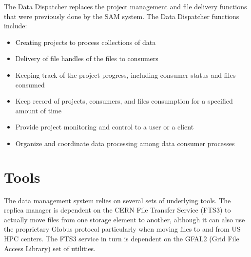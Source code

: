 \documentclass[../main-v1.tex]{subfiles}
\begin{document}
The Data Dispatcher replaces the project management and file delivery functions that were previously done by the SAM system.  The Data Dispatcher functions include:
\begin{itemize}
    \item Creating projects to process collections of data
    
    \item Delivery of file handles of the files to consumers
    
    \item Keeping track of the project progress, including consumer status and files consumed
    
    \item Keep record of projects, consumers, and files consumption for a specified amount of time
    
    \item Provide project monitoring and control to a user or a client
    
    \item Organize and coordinate data processing among data consumer processes

\end{itemize}



\section{Tools}

The data management system relies on several sets of underlying tools.  The  replica manager is dependent on the CERN File Transfer Service (FTS3) \cite{Kiryanov:2015fts} to actually move files from one storage element to another, although it can also use the proprietary
Globus protocol particularly when moving files to and from US HPC centers.  The FTS3 service in turn is dependent on the
GFAL2 (Grid File Access Library) set of utilities.
\end{document}
